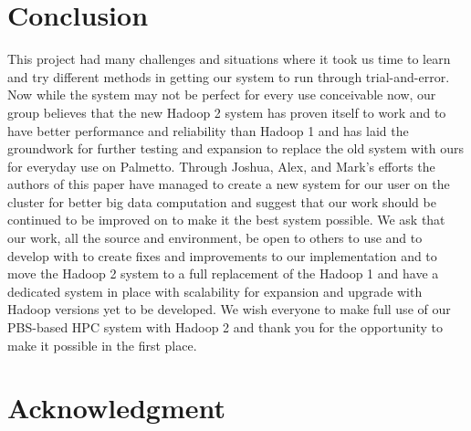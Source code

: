 \documentclass[conference]{IEEEtran}
\begin{document}
	\section{Conclusion}
			This project had many challenges and situations where it took us time to learn and try different methods in getting our system to run through trial-and-error. Now while the system may not be perfect for every use conceivable now, our group believes that the new Hadoop 2 system has proven itself to work and to have better performance and reliability than Hadoop 1 and has laid the groundwork for further testing and expansion to replace the old system with ours for everyday use on Palmetto. Through Joshua, Alex, and Mark's efforts the authors of this paper have managed to create a new system for our user on the cluster for better big data computation and suggest that our work should be continued to be improved on to make it the best system possible. We ask that our work\cite{projectcode}, all the source and environment, be open to others to use and to develop with to create fixes and improvements to our implementation and to move the Hadoop 2 system to a full replacement of the Hadoop 1 and have a dedicated system in place with scalability for expansion and upgrade with Hadoop versions yet to be developed. We wish everyone to make full use of our PBS-based HPC system with Hadoop 2 and thank you for the opportunity to make it possible in the first place.

	
	\section*{Acknowledgment}



\end{document}
